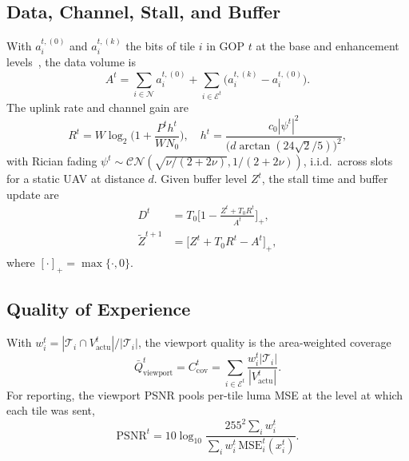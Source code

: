\documentclass[conference]{IEEEtran}
\newcommand{\Nset}{\mathcal{N}}
\newcommand{\Zt}{\widetilde{Z}}
\newcommand{\Vact}{V_{\mathrm{actu}}}
\newcommand{\Ccov}{C_{\mathrm{cov}}}
\begin{document}
\subsection{Data, Channel, Stall, and Buffer}
With $a_i^{t,(0)}$ and $a_i^{t,(k)}$ the bits of tile $i$ in GOP $t$ at the base and enhancement levels~\cite{chakareski2021dataset}, the data volume is
\begin{equation}
A^t=\textstyle\sum_{i\in\Nset}a_i^{t,(0)}+\sum_{i\in\mathcal{E}^t}\big(a_i^{t,(k)}-a_i^{t,(0)}\big).
\label{eq:data}
\end{equation}
The uplink rate and channel gain are~\cite{chakareski2025mmsp}
\begin{equation}
R^t=W\log_2\!\Big(1+\frac{P^th^t}{WN_0}\Big),\quad
h^t=\frac{c_0|\psi^t|^2}{\big(d\arctan(24\sqrt2/5)\big)^2},
\label{eq:rate}
\end{equation}
with Rician fading $\psi^t\sim\mathcal{CN}(\sqrt{\nu/(2+2\nu)},1/(2+2\nu))$, i.i.d.\ across slots for a static UAV at distance $d$. Given buffer level $Z^t$, the stall time and buffer update are
\begin{align}
D^t&=T_0\Big[1-\frac{Z^t+T_0R^t}{A^t}\Big]_+,\label{eq:stall}\\
\Zt^{t+1}&=\big[Z^t+T_0R^t-A^t\big]_+,\label{eq:buffer}
\end{align}
where $[\cdot]_+=\max\{\cdot,0\}$.

\subsection{Quality of Experience}
With $w_i^t=|\mathcal{T}_i\cap\Vact^t|/|\mathcal{T}_i|$, the viewport quality is the area-weighted coverage
\begin{equation}
\bar Q^t_{\mathrm{viewport}}=\Ccov^t=\sum_{i\in\mathcal{E}^t}\frac{w_i^t|\mathcal{T}_i|}{|\Vact^t|}.
\label{eq:coverage}
\end{equation}
For reporting, the viewport PSNR pools per-tile luma MSE at the level at which each tile was sent,
\begin{equation}
\mathrm{PSNR}^t=10\log_{10}\frac{255^2\sum_i w_i^t}{\sum_i w_i^t\,\mathrm{MSE}_i^t(x_i^t)}.
\label{eq:psnr}
\end{equation}
\end{document}
